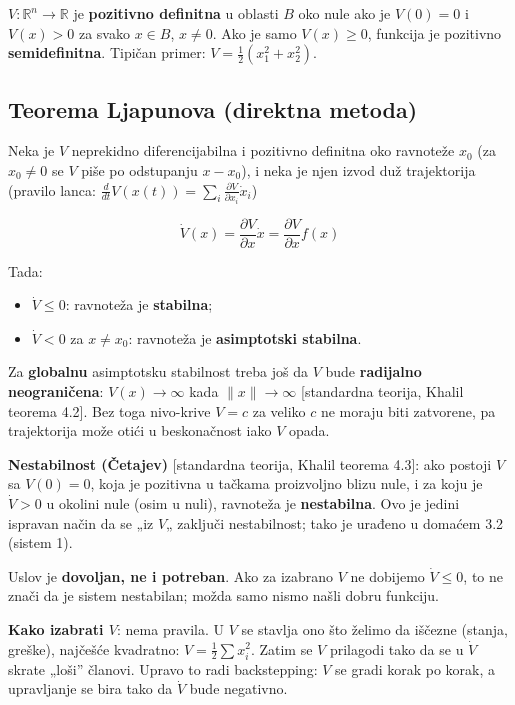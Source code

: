 \documentclass[11pt,a4paper,parskip=half,headsepline,numbers=noenddot]{scrartcl}
\DeclareRobustCommand{\izvor}[1]{{\small\color{izvorC}[#1]}}
\begin{document}
\(V: \mathbb{R}^n \to \mathbb{R}\) je \textbf{pozitivno definitna} u oblasti \(B\) oko nule ako je \(V(0) = 0\) i \(V(x) > 0\) za svako \(x \in B\), \(x \ne 0\). Ako je samo \(V(x) \ge 0\), funkcija je pozitivno \textbf{semidefinitna}. Tipičan primer: \(V = \frac12(x_1^2 + x_2^2)\).

\subsection{Teorema Ljapunova (direktna metoda)}

Neka je \(V\) neprekidno diferencijabilna i pozitivno definitna oko ravnoteže \(x_0\) (za \(x_0 \ne 0\) se \(V\) piše po odstupanju \(x - x_0\)), i neka je njen izvod duž trajektorija (pravilo lanca: \(\frac{d}{dt}V(x(t)) = \sum_i \frac{\partial V}{\partial x_i}\dot x_i\))

\[\dot V(x) = \frac{\partial V}{\partial x}\dot x = \frac{\partial V}{\partial x}f(x)\]

Tada:

\begin{itemize}
\item \(\dot V \le 0\): ravnoteža je \textbf{stabilna};
\item \(\dot V < 0\) za \(x \ne x_0\): ravnoteža je \textbf{asimptotski stabilna}.
\end{itemize}

Za \textbf{globalnu} asimptotsku stabilnost treba još da \(V\) bude \textbf{radijalno neograničena}: \(V(x) \to \infty\) kada \(\|x\| \to \infty\) \izvor{standardna teorija, Khalil teorema 4.2}. Bez toga nivo-krive \(V = c\) za veliko \(c\) ne moraju biti zatvorene, pa trajektorija može otići u beskonačnost iako \(V\) opada.

\textbf{Nestabilnost (Četajev)} \izvor{standardna teorija, Khalil teorema 4.3}: ako postoji \(V\) sa \(V(0) = 0\), koja je pozitivna u tačkama proizvoljno blizu nule, i za koju je \(\dot V > 0\) u okolini nule (osim u nuli), ravnoteža je \textbf{nestabilna}. Ovo je jedini ispravan način da se „iz \(V\)„ zaključi nestabilnost; tako je urađeno u domaćem 3.2 (sistem 1).

\begin{kljucna}
Uslov je \textbf{dovoljan, ne i potreban}. Ako za izabrano \(V\) ne dobijemo \(\dot V \le 0\), to ne znači da je sistem nestabilan; možda samo nismo našli dobru funkciju.
\end{kljucna}

\textbf{Kako izabrati \(V\)}: nema pravila. U \(V\) se stavlja ono što želimo da iščezne (stanja, greške), najčešće kvadratno: \(V = \frac12\sum x_i^2\). Zatim se \(V\) prilagodi tako da se u \(\dot V\) skrate „loši'' članovi. Upravo to radi backstepping: \(V\) se gradi korak po korak, a upravljanje se bira tako da \(\dot V\) bude negativno.
\end{document}
